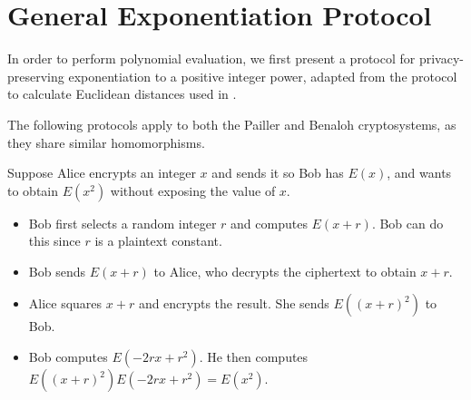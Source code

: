 \section{General Exponentiation Protocol}
In order to perform polynomial evaluation, we first present a protocol for privacy-preserving exponentiation to a positive integer power, adapted from the protocol to calculate Euclidean distances used in \cite{hutchison_privacy-preserving_2009}.

The following protocols apply to both the Pailler and Benaloh cryptosystems, as they share similar homomorphisms.

Suppose Alice encrypts an integer $x$ and sends it so Bob has $E(x)$, and wants to obtain $E(x^2)$ without exposing the value of $x$.
\begin{itemize}
	\item Bob first selects a random integer $r$ and computes $E(x+r)$. Bob can do this since $r$ is a plaintext constant.
	\item Bob sends $E(x+r)$ to Alice, who decrypts the ciphertext to obtain $x+r$.
	\item Alice squares $x+r$ and encrypts the result. She sends $E((x+r)^2)$ to Bob.
	\item Bob computes $E(-2rx + r^2)$. He then computes $E((x+r)^2)E(-2rx + r^2) = E(x^2)$.
\end{itemize}
